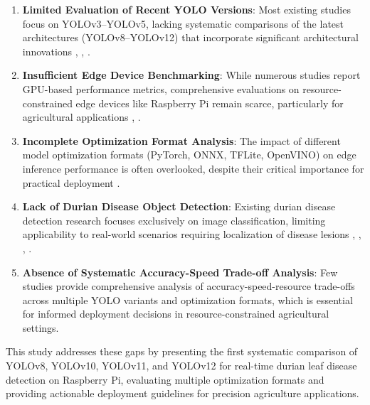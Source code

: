\begin{enumerate}
\item \textbf{Limited Evaluation of Recent YOLO Versions}: Most existing studies focus on YOLOv3--YOLOv5, lacking systematic comparisons of the latest architectures (YOLOv8--YOLOv12) that incorporate significant architectural innovations \cite{4}, \cite{14}, \cite{25}.

\item \textbf{Insufficient Edge Device Benchmarking}: While numerous studies report GPU-based performance metrics, comprehensive evaluations on resource-constrained edge devices like Raspberry Pi remain scarce, particularly for agricultural applications \cite{22}, \cite{42}.

\item \textbf{Incomplete Optimization Format Analysis}: The impact of different model optimization formats (PyTorch, ONNX, TFLite, OpenVINO) on edge inference performance is often overlooked, despite their critical importance for practical deployment \cite{47}.

\item \textbf{Lack of Durian Disease Object Detection}: Existing durian disease detection research focuses exclusively on image classification, limiting applicability to real-world scenarios requiring localization of disease lesions \cite{50}, \cite{51}, \cite{52}, \cite{53}.

\item \textbf{Absence of Systematic Accuracy-Speed Trade-off Analysis}: Few studies provide comprehensive analysis of accuracy-speed-resource trade-offs across multiple YOLO variants and optimization formats, which is essential for informed deployment decisions in resource-constrained agricultural settings.
\end{enumerate}

This study addresses these gaps by presenting the first systematic comparison of YOLOv8, YOLOv10, YOLOv11, and YOLOv12 for real-time durian leaf disease detection on Raspberry Pi, evaluating multiple optimization formats and providing actionable deployment guidelines for precision agriculture applications.
